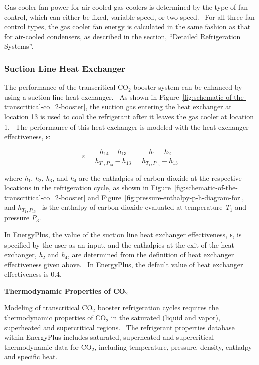 Gas cooler fan power for air-cooled gas coolers is determined by the type of fan control, which can either be fixed, variable speed, or two-speed.~ For all three fan control types, the gas cooler fan energy is calculated in the same fashion as that for air-cooled condensers, as described in the section, ``Detailed Refrigeration Systems''.

\subsubsection{Suction Line Heat Exchanger}\label{suction-line-heat-exchanger}

The performance of the transcritical CO\(_{2}\) booster system can be enhanced by using a suction line heat exchanger.~ As shown in Figure~\ref{fig:schematic-of-the-transcritical-co_2-booster}, the suction gas entering the heat exchanger at location 13 is used to cool the refrigerant after it leaves the gas cooler at location 1.~ The performance of this heat exchanger is modeled with the heat exchanger effectiveness, ε:

\begin{equation}
\varepsilon  = \frac{{{h_{14}} - {h_{13}}}}{{{h_{{T_1},{P_{13}}}} - {h_{13}}}} = \frac{{{h_1} - {h_2}}}{{{h_{{T_1},{P_{13}}}} - {h_{13}}}}
\end{equation}

where \emph{h}\(_{1}\), \emph{h}\(_{2}\), \emph{h}\(_{3}\), and \emph{h}\(_{4}\) are the enthalpies of carbon dioxide at the respective locations in the refrigeration cycle, as shown in Figure~\ref{fig:schematic-of-the-transcritical-co_2-booster} and Figure~\ref{fig:pressure-enthalpy-p-h-diagram-for}, and \({h_{{T_1},{P_{13}}}}\) ~is the enthalpy of carbon dioxide evaluated at temperature \emph{T}\(_{1}\) and pressure \emph{P}\(_{3}\).

In EnergyPlus, the value of the suction line heat exchanger effectiveness, ε, is specified by the user as an input, and the enthalpies at the exit of the heat exchanger, \emph{h}\(_{2}\) and \emph{h}\(_{4}\), are determined from the definition of heat exchanger effectiveness given above.~ In EnergyPlus, the default value of heat exchanger effectiveness is 0.4.

\textbf{Thermodynamic Properties of CO\(_{2}\)}

Modeling of transcritical CO\(_{2}\) booster refrigeration cycles requires the thermodynamic properties of CO\(_{2}\) in the saturated (liquid and vapor), superheated and supercritical regions.~ The refrigerant properties database within EnergyPlus includes saturated, superheated and supercritical thermodynamic data for CO\(_{2}\), including temperature, pressure, density, enthalpy and specific heat.

